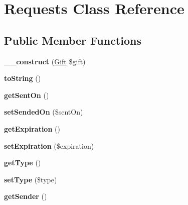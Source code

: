 \hypertarget{class_requests}{\section{Requests Class Reference}
\label{class_requests}
}
\subsection*{Public Member Functions}
\begin{DoxyCompactItemize}
\item 
\hypertarget{class_requests_a59623e90d41e1ac9abafaaabb3325cac}{{\bfseries \+\_\+\+\_\+construct} (\hyperlink{class_gift}{Gift} \$gift)}\label{class_requests_a59623e90d41e1ac9abafaaabb3325cac}

\item 
\hypertarget{class_requests_a5558c5d549f41597377fa1ea8a1cefa3}{{\bfseries to\+String} ()}\label{class_requests_a5558c5d549f41597377fa1ea8a1cefa3}

\item 
\hypertarget{class_requests_afebcc0d238602fc3d1afb0d4c6651a38}{{\bfseries get\+Sent\+On} ()}\label{class_requests_afebcc0d238602fc3d1afb0d4c6651a38}

\item 
\hypertarget{class_requests_aaac3c555ab163b0d1d10cfb0bca3d9f6}{{\bfseries set\+Sended\+On} (\$sent\+On)}\label{class_requests_aaac3c555ab163b0d1d10cfb0bca3d9f6}

\item 
\hypertarget{class_requests_a3bcc813b51259f135a2ff7a3cdba2659}{{\bfseries get\+Expiration} ()}\label{class_requests_a3bcc813b51259f135a2ff7a3cdba2659}

\item 
\hypertarget{class_requests_a26bb008b7ee52c1ea080b1cb38dacb77}{{\bfseries set\+Expiration} (\$expiration)}\label{class_requests_a26bb008b7ee52c1ea080b1cb38dacb77}

\item 
\hypertarget{class_requests_a830b5c75df72b32396701bc563fbe3c7}{{\bfseries get\+Type} ()}\label{class_requests_a830b5c75df72b32396701bc563fbe3c7}

\item 
\hypertarget{class_requests_ade096bf521b5d05dcaff2ba1a42e9f71}{{\bfseries set\+Type} (\$type)}\label{class_requests_ade096bf521b5d05dcaff2ba1a42e9f71}

\item 
\hypertarget{class_requests_a448557d1caa590a39b8a6ec144b59d94}{{\bfseries get\+Sender} ()}\label{class_requests_a448557d1caa590a39b8a6ec144b59d94}


\end{DoxyCompactItemize}
